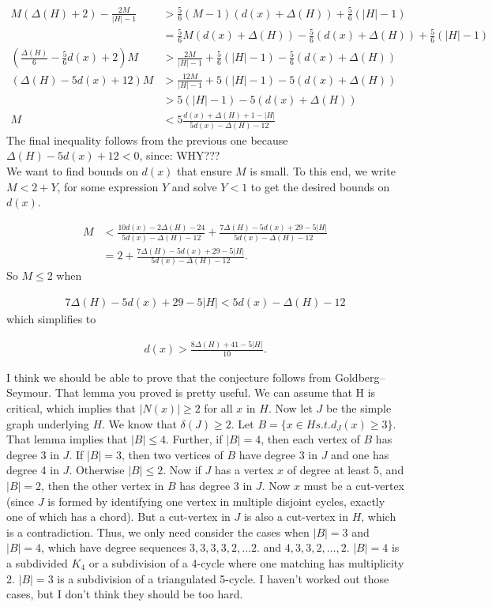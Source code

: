 \documentclass[12pt]{amsart}
\theoremstyle{plain}
\theoremstyle{definition}
\theoremstyle{remark}
\begin{document}
\begin{align*}
M(\Delta(H) + 2) - \frac{2M}{|H| - 1} &>  \frac56(M-1)(d(x) + \Delta(H)) + \frac56(|H|
- 1) \\
&= \frac56M(d(x) + \Delta(H)) - \frac56(d(x) + \Delta(H)) + \frac56(|H| - 1)\\
\left(\frac{\Delta(H)}6 - \frac56d(x) + 2\right)M &> \frac{2M}{|H| - 1} + 
\frac56(|H| - 1) - \frac56(d(x) + \Delta(H))\\
(\Delta(H) - 5d(x) + 12)M &> \frac{12M}{|H| - 1} +  5(|H| - 1) - 5(d(x) +
\Delta(H))\\ & > 5(|H| - 1) - 5(d(x) + \Delta(H))\\
M &< 5\frac{d(x) + \Delta(H) + 1 - |H|}{5d(x) - \Delta(H) - 12}
\end{align*}
The final inequality follows from the previous one because
$\Delta(H)-5d(x)+12<0$, since: WHY???\\
We want to find bounds on $d(x)$ that ensure $M$ is small.  To this end, we
write $M<2+Y$, for some expression $Y$ and solve $Y<1$ to get the desired bounds
on $d(x)$.

\begin{align*}
M &< \frac{10d(x) - 2\Delta(H) - 24}{5d(x) - \Delta(H) - 12} + \frac{7\Delta(H) -
5d(x) + 29 - 5|H|}{5d(x) - \Delta(H) - 12} \\
&= 2 + \frac{7\Delta(H) - 5d(x) + 29 - 5|H|}{5d(x) - \Delta(H) - 12}.
\end{align*}
So $M\le 2$ when

\begin{align*}
7\Delta(H) - 5d(x) + 29 - 5|H| < 5d(x) - \Delta(H) - 12
\end{align*}
which simplifies to

\begin{align*}
d(x) > \frac{8\Delta(H) + 41 - 5|H|}{10}.
\end{align*}



\bigskip
\bigskip

I think we should be able to prove that the conjecture follows from
Goldberg--Seymour.
That lemma you proved is pretty useful.  We can assume that H is
critical, which implies that $|N(x)| \ge 2$ for all $x$ in $H$.  Now let $J$
be the simple graph underlying $H$.  We know that $\delta(J) \ge 2$.  Let
$B = \{ x \in H s.t. d_J(x) \ge 3\}$.  That lemma implies that $|B| \le 4$.
Further, if $|B| = 4$, then each vertex of $B$ has degree 3 in $J$.  If
$|B|=3$, then two vertices of $B$ have degree 3 in $J$ and one has degree 4
in $J$.  Otherwise $|B| \le 2$.  Now if $J$ has a vertex $x$ of degree at
least 5, and $|B|=2$, then the other vertex in $B$ has degree 3 in $J$.  Now
$x$ must be a cut-vertex (since $J$ is formed by identifying one vertex in
multiple disjoint cycles, exactly one of which has a chord).  But a
cut-vertex in $J$ is also a cut-vertex in $H$, which is a contradiction.
Thus, we only need consider the cases when $|B|=3$ and $|B|=4$, which have
degree sequences $3,3,3,3,2,\ldots2$. and $4,3,3,2,\ldots,2$.
$|B|=4$ is a subdivided $K_4$ or a subdivision of a 4-cycle where one
matching has multiplicity 2.
$|B|=3$ is a subdivision of a triangulated 5-cycle.  I haven't worked
out those cases, but I don't think they should be too hard.
\end{document}
